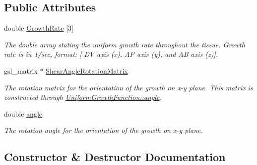 \subsection*{Public Attributes}
\begin{DoxyCompactItemize}
\item 
\hypertarget{classUniformGrowthFunction_af78591902b0cc391a62f3093fd14ad10}{}double \hyperlink{classUniformGrowthFunction_af78591902b0cc391a62f3093fd14ad10}{Growth\+Rate} \mbox{[}3\mbox{]}\label{classUniformGrowthFunction_af78591902b0cc391a62f3093fd14ad10}

\begin{DoxyCompactList}\small\item\em The double array stating the uniform growth rate throughout the tissue. Growth rate is in 1/sec, format\+: \mbox{[} D\+V axis (x), A\+P axis (y), and A\+B axis (z)\mbox{]}. \end{DoxyCompactList}\item 
\hypertarget{classUniformGrowthFunction_afef9ac84dfe60bbf3d558fbb31946087}{}gsl\+\_\+matrix $\ast$ \hyperlink{classUniformGrowthFunction_afef9ac84dfe60bbf3d558fbb31946087}{Shear\+Angle\+Rotation\+Matrix}\label{classUniformGrowthFunction_afef9ac84dfe60bbf3d558fbb31946087}

\begin{DoxyCompactList}\small\item\em The rotation matrix for the orientation of the growth on x-\/y plane. This matrix is constructed through \hyperlink{classUniformGrowthFunction_a1a985ff52f9796688e00942b4d3349f8}{Uniform\+Growth\+Function\+::angle}. \end{DoxyCompactList}\item 
\hypertarget{classUniformGrowthFunction_a1a985ff52f9796688e00942b4d3349f8}{}double \hyperlink{classUniformGrowthFunction_a1a985ff52f9796688e00942b4d3349f8}{angle}\label{classUniformGrowthFunction_a1a985ff52f9796688e00942b4d3349f8}

\begin{DoxyCompactList}\small\item\em The rotation angle for the orientation of the growth on x-\/y plane. \end{DoxyCompactList}\end{DoxyCompactItemize}


\subsection{Constructor \& Destructor Documentation}
\hypertarget{classUniformGrowthFunction_a9ea553c72b2d5e83e98e4ec7a8c025b6}{}

